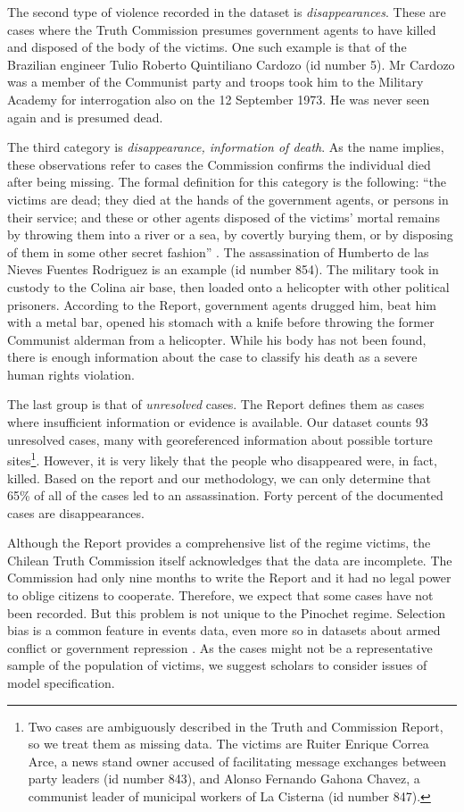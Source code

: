 \documentclass[12pt,a4paper,]{article}
\begin{document}
The second type of violence recorded in the dataset is
\emph{disappearances}. These are cases where the Truth Commission
presumes government agents to have killed and disposed of the body of
the victims. One such example is that of the Brazilian engineer Tulio
Roberto Quintiliano Cardozo (id number 5). Mr Cardozo was a member of
the Communist party and troops took him to the Military Academy for
interrogation also on the 12 September 1973. He was never seen again and
is presumed dead.

The third category is \emph{disappearance, information of death}. As the
name implies, these observations refer to cases the Commission confirms
the individual died after being missing. The formal definition for this
category is the following: ``the victims are dead; they died at the
hands of the government agents, or persons in their service; and these
or other agents disposed of the victims' mortal remains by throwing them
into a river or a sea, by covertly burying them, or by disposing of them
in some other secret fashion'' \citep[ 44]{report1991}. The
assassination of Humberto de las Nieves Fuentes Rodriguez is an example
(id number 854). The military took in custody to the Colina air base,
then loaded onto a helicopter with other political prisoners. According
to the Report, government agents drugged him, beat him with a metal bar,
opened his stomach with a knife before throwing the former Communist
alderman from a helicopter. While his body has not been found, there is
enough information about the case to classify his death as a severe
human rights violation.

The last group is that of \emph{unresolved} cases. The Report defines
them as cases where insufficient information or evidence is available.
Our dataset counts 93 unresolved cases, many with georeferenced
information about possible torture sites\footnote{Two cases are
  ambiguously described in the Truth and Commission Report, so we treat
  them as missing data. The victims are Ruiter Enrique Correa Arce, a
  news stand owner accused of facilitating message exchanges between
  party leaders (id number 843), and Alonso Fernando Gahona Chavez, a
  communist leader of municipal workers of La Cisterna (id number 847).}.
However, it is very likely that the people who disappeared were, in
fact, killed. Based on the report and our methodology, we can only
determine that 65\% of all of the cases led to an assassination. Forty
percent of the documented cases are disappearances.

Although the Report provides a comprehensive list of the regime victims,
the Chilean Truth Commission itself acknowledges that the data are
incomplete. The Commission had only nine months to write the Report and
it had no legal power to oblige citizens to cooperate. Therefore, we
expect that some cases have not been recorded. But this problem is not
unique to the Pinochet regime. Selection bias is a common feature in
events data, even more so in datasets about armed conflict or government
repression \citep{ball2019using, chapman2001truth}. As the cases might
not be a representative sample of the population of victims, we suggest
scholars to consider issues of model specification.
\end{document}
